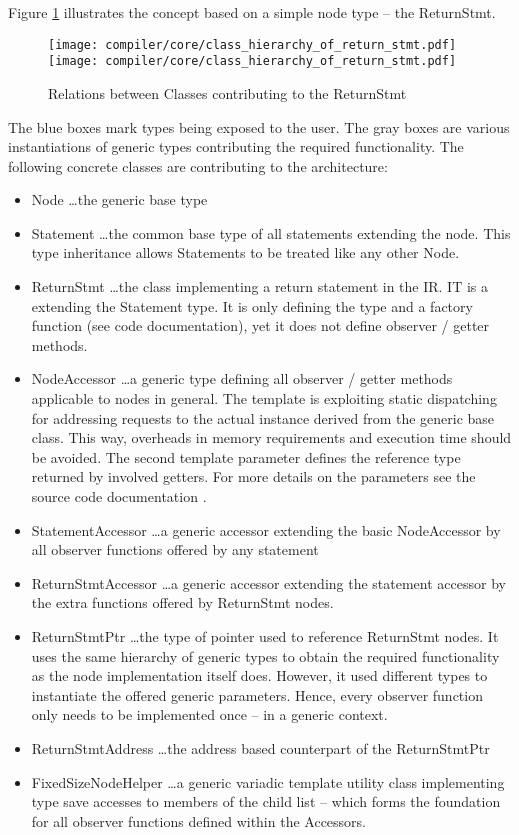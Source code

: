 Figure \ref{fig:Compiler.Core.Classes.ReturnStmt} illustrates the concept based
on a simple node type -- the ReturnStmt.
\begin{figure}[tb]
	\centering
	\texttt{[image: compiler/core/class\_hierarchy\_of\_return\_stmt.pdf]}
	\texttt{[image: compiler/core/class\_hierarchy\_of\_return\_stmt.pdf]}
	\caption{Relations between Classes contributing to the ReturnStmt}
	\label{fig:Compiler.Core.Classes.ReturnStmt}
\end{figure}
The blue boxes mark types being exposed to the user. The gray boxes are various
instantiations of generic types contributing the required functionality. The
following concrete classes are contributing to the architecture:
\begin{itemize}
  \item Node \ldots the generic base type
  \item Statement \ldots the common base type of all statements extending the
  node. This type inheritance allows Statements to be treated like any
  other Node.
  \item ReturnStmt \ldots the class implementing a return statement in the IR.
  IT is a extending the Statement type. It is only defining the type and a
  factory function (see code documentation), yet it does not define observer /
  getter methods.
  \item NodeAccessor \ldots a generic type defining all observer /
  getter methods applicable to nodes in general. The template is exploiting
  static dispatching for addressing requests to the actual instance derived from
  the generic base class. This way, overheads in memory requirements and
  execution time should be avoided. The second template parameter defines the
  reference type returned by involved getters. For more details on the
  parameters see the source code documentation \cite{insieme_source_doc}.
  \item StatementAccessor \ldots a generic accessor extending the basic
  NodeAccessor by all observer functions offered by any statement
  \item ReturnStmtAccessor \ldots a generic accessor extending the
  statement accessor by the extra functions offered by ReturnStmt nodes.
  \item ReturnStmtPtr \ldots the type of pointer used to reference ReturnStmt
  nodes. It uses the same hierarchy of generic types to obtain the required
  functionality as the node implementation itself does. However, it used
  different types to instantiate the offered generic parameters. Hence, every
  observer function only needs to be implemented once -- in a generic context.
  \item ReturnStmtAddress \ldots the address based counterpart of the
  ReturnStmtPtr
  \item FixedSizeNodeHelper \ldots a generic variadic template utility class
  implementing type save accesses to members of the child list -- which forms
  the foundation for all observer functions defined within the Accessors.
\end{itemize}


